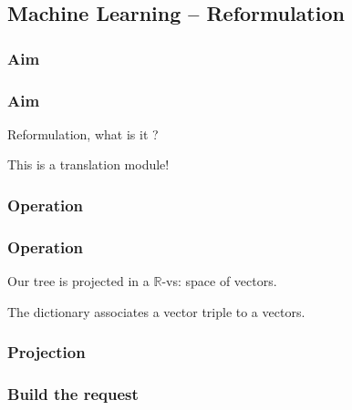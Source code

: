 \subsection{Machine Learning \--- Reformulation}

\subsubsection{Aim}

\begin{frame}
\frametitle{Aim}
Reformulation, what is it ?
\pause


This is a translation module! %


\end{frame}

\subsubsection{Operation}
\begin{frame}
\frametitle{Operation}
Our tree is projected in a $\mathbb{R}$-vs: space of vectors.

\begin{defi}
The dictionary associates a vector triple to a vectors.
\end{defi}

\end{frame}

\begin{frame}
\frametitle{Projection}
\end{frame}

\subsubsection{Build the request}

